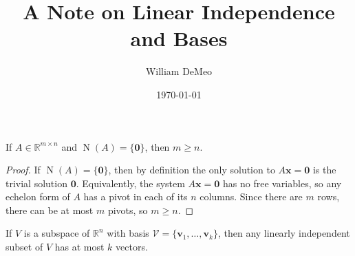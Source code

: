 \documentclass{article}
\title{A Note on Linear Independence and Bases}
\author{William DeMeo}
\date{\today}
\newcommand{\R}{\ensuremath{\mathbb{R}}}
\newcommand{\vN}{\ensuremath{\operatorname{N}}}
\newcommand{\sV}{\ensuremath{\mathcal{V}}}
\newcommand{\vx}{\ensuremath{\mathbf{x}}}
\newcommand{\vzero}{\ensuremath{\mathbf{0}}}
\begin{document}
\maketitle

If $A \in \R^{m\times n}$ and $\vN(A)= \{\vzero\}$, then
$m\geq n$.
\begin{proof}
If $\vN(A)= \{\vzero\}$, then by definition the only solution to
$A \vx = \vzero$ is the trivial solution $\vzero$.  Equivalently, the system 
$A\vx = \vzero$ has no free variables, so any echelon form of $A$ has a 
pivot in each of its $n$ columns. 
Since there are $m$ rows, there can be at most $m$ pivots, so
$m\geq n$.
\end{proof}

If $V$ is a subspace of $\R^n$ with basis 
$\sV = \{\mathbf{v}_1,\dots, \mathbf{v}_k\}$, then
any linearly independent subset of $V$ has at most $k$ vectors.
\end{document}
